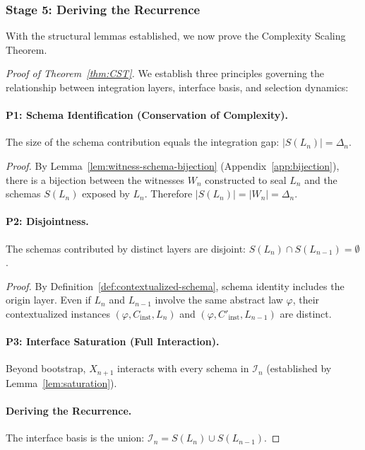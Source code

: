 \documentclass[11pt]{article}
\theoremstyle{definition}
\theoremstyle{remark}
\begin{document}
\subsubsection{Stage 5: Deriving the Recurrence}

With the structural lemmas established, we now prove the Complexity Scaling Theorem.

\begin{proof}[Proof of Theorem~\ref{thm:CST}]
We establish three principles governing the relationship between integration layers, interface basis,
and selection dynamics:

\paragraph{P1: Schema Identification (Conservation of Complexity).}
The size of the schema contribution equals the integration gap: $|S(L_n)| = \Delta_n$.

\emph{Proof.} By Lemma~\ref{lem:witness-schema-bijection} (Appendix~\ref{app:bijection}), there is a
bijection between the witnesses $W_n$ constructed to seal $L_n$ and the schemas $S(L_n)$ exposed by
$L_n$. Therefore $|S(L_n)| = |W_n| = \Delta_n$.

\paragraph{P2: Disjointness.}
The schemas contributed by distinct layers are disjoint: $S(L_n) \cap S(L_{n-1}) = \emptyset$.

\emph{Proof.} By Definition~\ref{def:contextualized-schema}, schema identity includes the origin layer.
Even if $L_n$ and $L_{n-1}$ involve the same abstract law $\varphi$, their contextualized instances
$(\varphi, C_{\text{inst}}, L_n)$ and $(\varphi, C'_{\text{inst}}, L_{n-1})$ are distinct.

\paragraph{P3: Interface Saturation (Full Interaction).}
Beyond bootstrap, $X_{n+1}$ interacts with every schema in $\mathcal{I}_n$ (established by
Lemma~\ref{lem:saturation}).

\paragraph{Deriving the Recurrence.}
The interface basis is the union: $\mathcal{I}_n = S(L_n) \cup S(L_{n-1})$.


\end{proof}
\end{document}
